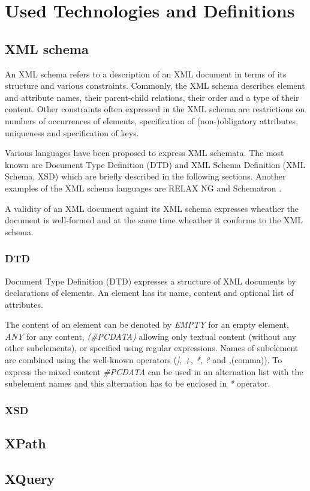 \chapter{Used Technologies and Definitions}


\section{XML schema}
An XML schema refers to a description of an XML document in terms of its structure and various constraints. Commonly, the XML schema describes element and attribute names, their parent-child relations, their order and a type of their content. Other constraints often expressed in the XML schema are restrictions on numbers of occurrences of elements, specification of (non-)obligatory attributes, uniqueness and specification of keys.

Various languages have been proposed to express XML schemata. The most known are Document Type Definition (DTD)  and XML Schema Definition (XML Schema, XSD)  which are briefly described in the following sections. Another examples of the XML schema languages are RELAX NG  and  Schematron .

A validity of an XML document againt its XML schema expresses wheather the document is well-formed  and at the same time wheather it conforms to the XML schema.

\subsection{DTD}
Document Type Definition (DTD) expresses a structure of XML documents by declarations of elements. An element has its name, content and optional list of attributes.

The content of an element can be denoted by \emph{EMPTY} for an empty element, \emph{ANY} for any content, \emph{(\#PCDATA)} allowing only textual content (without any other subelements), or specified using regular expressions. Names of subelement are combined using the well-known operators (\emph{|}, \emph{+}, \emph{*}, \emph{?} and \emph{,}(comma)). To express the mixed content \emph{\#PCDATA} can be used in an alternation list with the subelement names and this alternation has to be enclosed in \emph{*} operator.


\subsection{XSD}

\section{XPath}

\section{XQuery}

